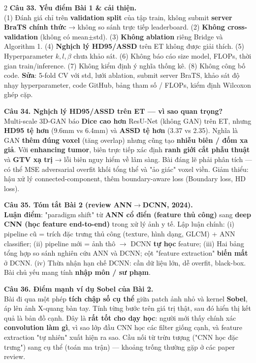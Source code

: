 \begin{paracol}{2}
\textbf{Câu 33. Yếu điểm Bài 1 \& cải thiện.}\\
(1) Đánh giá chỉ trên \textbf{validation split} của tập train, không submit \textbf{server BraTS chính thức} → không so sánh trực tiếp leaderboard. (2) \textbf{Không cross-validation} (không có mean$\pm$std). (3) \textbf{Không ablation} riêng Bridge và Algorithm 1. (4) \textbf{Nghịch lý HD95/ASSD} trên ET không được giải thích. (5) Hyperparameter $k,l,\beta$ chưa khảo sát. (6) Không báo cáo size model, FLOPs, thời gian train/inference. (7) Không kiểm định ý nghĩa thống kê. (8) Không công bố code. \textbf{Sửa}: 5-fold CV với std, lưới ablation, submit server BraTS, khảo sát độ nhạy hyperparameter, code GitHub, bảng tham số / FLOPs, kiểm định Wilcoxon ghép cặp.

\textbf{Câu 34. Nghịch lý HD95/ASSD trên ET — vì sao quan trọng?}\\
Multi-scale 3D-GAN báo \textbf{Dice cao hơn} ResU-Net (không GAN) trên ET, nhưng \textbf{HD95 tệ hơn} (9.6mm vs 6.4mm) và \textbf{ASSD tệ hơn} (3.37 vs 2.35). Nghĩa là GAN \textbf{thêm đúng voxel} (tăng overlap) nhưng cũng tạo \textbf{nhiễu biên / đốm xa giả}. Với \textbf{enhancing tumor}, biên trực tiếp xác định \textbf{ranh giới cắt phẫu thuật} và \textbf{GTV xạ trị} → lỗi biên nguy hiểm về lâm sàng. Bài đáng lẽ phải phân tích — có thể MSE adversarial overfit khối tổng thể và "ảo giác" voxel viền. Giảm thiểu: hậu xử lý connected-component, thêm boundary-aware loss (Boundary loss, HD loss).

\textbf{Câu 35. Tóm tắt Bài 2 (review ANN$\to$DCNN, 2024).}\\
\textbf{Luận điểm}: "paradigm shift" từ \textbf{ANN cổ điển (feature thủ công)} sang \textbf{deep CNN (học feature end-to-end)} trong xử lý ảnh y tế. Lập luận chính: (i) pipeline cũ = trích đặc trưng thủ công (texture, hình dạng, GLCM) + ANN classifier; (ii) pipeline mới = ảnh thô $\to$ DCNN \textbf{tự học} feature; (iii) Hai bảng tổng hợp so sánh nghiên cứu ANN và DCNN; cột "feature extraction" \textbf{biến mất} ở DCNN. (iv) Thừa nhận hạn chế DCNN: cần dữ liệu lớn, dễ overfit, black-box. Bài chủ yếu mang tính \textbf{nhập môn / sư phạm}.

\textbf{Câu 36. Điểm mạnh ví dụ Sobel của Bài 2.}\\
Bài đi qua một phép \textbf{tích chập số cụ thể} giữa patch ảnh nhỏ và kernel \textbf{Sobel}, áp lên ảnh X-quang bàn tay. Tính từng bước trên giá trị thật, sau đó hiển thị kết quả là bản đồ cạnh. Đây là \textbf{rất tốt cho dạy học}: người mới thấy chính xác \textbf{convolution làm gì}, vì sao lớp đầu CNN học các filter giống cạnh, và feature extraction "tự nhiên" xuất hiện ra sao. Cầu nối từ trừu tượng ("CNN học đặc trưng") sang cụ thể (toán ma trận) — khoảng trống thường gặp ở các paper review.


\end{paracol}
